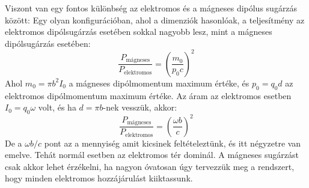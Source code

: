 \documentclass[../main.tex]{subfiles}
\begin{document}
Viszont van egy fontos különbség az elektromos és a mágneses dipólus sugárzás között: Egy olyan konfigurációban, ahol a dimenziók hasonlóak, a teljesítmény az elektromos dipólsugárzás esetében sokkal nagyobb lesz, mint a mágneses dipólsugárzás esetében:
\begin{equation}
    \frac{P_{\text{mágneses}}}{P_{\text{elektromos}}} = \left(\frac{m_0}{p_0c}\right)^2
\end{equation}
Ahol $m_0 = \pi b^2 I_0$ a mágneses dipólmomentum maximum értéke, és $p_0 = q_0 d$ az elektromos dipólmomentum maximum értéke. Az áram az elektromos esetben $I_0 = q_0 \omega$ volt, és ha $d = \pi b$-nek vesszük, akkor:
\begin{equation}
    \frac{P_{\text{mágneses}}}{P_{\text{elektromos}}} = \left(\frac{\omega b}{c}\right)^2
\end{equation}
De a $\omega b / c$ pont az a mennyiség amit kicsinek feltételeztünk, és itt négyzetre van emelve. Tehát normál esetben az elektromos tér dominál. A mágneses sugárzást csak akkor lehet érzékelni,
ha nagyon óvatosan úgy tervezzük meg a rendszert, hogy minden elektromos hozzájárulást kiiktassunk.
\end{document}
